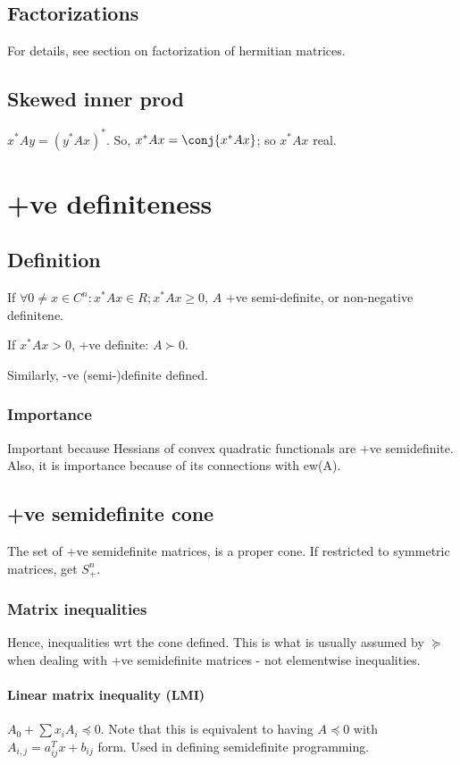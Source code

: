 \documentclass[oneside, article]{memoir}
\begin{document}
\subsection{Factorizations}
For details, see section on factorization of hermitian matrices.

\subsection{Skewed inner prod }
$x^{*}Ay = (y^{*}Ax)^{*}$. So, $x^{*}Ax = \conj{x^{*}Ax}$; so $x^{*}Ax$ real.

\section{+ve definiteness}
\subsection{Definition}
If $\forall 0 \neq x \in C^{n}: x^{*}Ax \in R; x^{*}Ax \geq 0$, $A$ +ve semi-definite, or non-negative definitene.

If $x^{*}Ax > 0$, +ve definite: $A \succ 0$.

Similarly, -ve (semi-)definite defined.

\subsubsection{Importance}
Important because Hessians of convex quadratic functionals are +ve semidefinite. Also, it is importance because of its connections with ew(A).

\subsection{+ve semidefinite cone}
The set of +ve semidefinite matrices, is a proper cone. If restricted to symmetric matrices, get $S_+^{n}$.

\subsubsection{Matrix inequalities}
Hence, inequalities wrt the cone defined.  This is what is usually assumed by $\succeq$ when dealing with +ve semidefinite matrices - not elementwise inequalities.

\paragraph*{Linear matrix inequality (LMI)}
$A_0 + \sum x_i A_i \preceq 0$. Note that this is equivalent to having $A \preceq 0$ with $A_{i,j} = a_{ij}^{T}x + b_{ij}$ form. Used in defining semidefinite programming.
\end{document}
